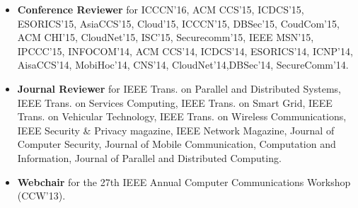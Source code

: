 \documentclass[letter]{article}
\newenvironment{tightitem}
{\begin{itemize}
\setlength{\itemsep}{1pt}
\setlength{\parskip}{0pt}
\setlength{\parsep}{0pt}}
{\end{itemize}}
\begin{document}
\begin{description}
\begin{itemize}

\item \textbf{Conference Reviewer} for ICCCN'16, ACM CCS'15, ICDCS'15, ESORICS'15, AsiaCCS'15, Cloud'15, ICCCN'15, DBSec'15, CoudCom'15, ACM CHI'15, CloudNet'15, ISC'15, Securecomm'15, IEEE MSN'15, IPCCC'15, INFOCOM'14, ACM CCS'14, ICDCS'14, ESORICS'14, ICNP'14, AisaCCS'14, MobiHoc'14, CNS'14, CloudNet'14,DBSec'14, SecureComm'14.
\item \textbf{Journal Reviewer} for IEEE Trans. on Parallel and Distributed Systems, IEEE Trans. on Services Computing, IEEE Trans. on Smart Grid, IEEE Trans. on Vehicular Technology, IEEE Trans. on Wireless Communications, IEEE Security \& Privacy magazine, IEEE Network Magazine, Journal of Computer Security, Journal of Mobile Communication, Computation and Information, Journal of Parallel and Distributed Computing.


\item \textbf{Webchair} for the 27th IEEE Annual Computer Communications Workshop (CCW'13).

\end{itemize}



\end{description}
\end{document}
